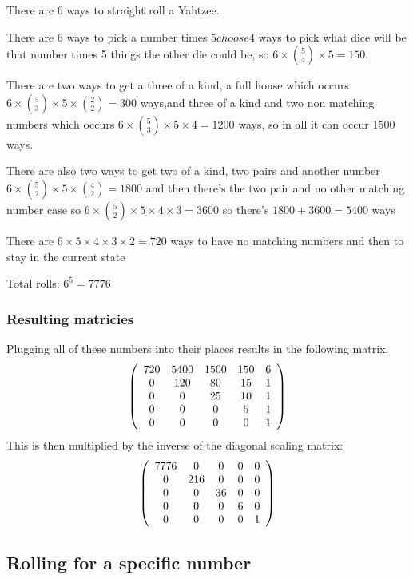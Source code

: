 There are 6 ways to straight roll a Yahtzee.

There are 6 ways to pick a number times ${5 choose 4}$ ways to pick what dice will be that number times 5 things the other die could be, so $6\times{5 \choose 4} \times5 = 150$.

There are two ways to get a three of a kind, a full house which occurs $6\times{5 \choose 3}\times5\times{2 \choose 2}=300$ ways,and three of a kind and two non matching numbers which occurs $6\times{5 \choose 3} \times5\times4=1200$ ways, so in all it can occur 1500 ways.

There are also two ways to get two of a kind, two pairs and another number $6\times{5 \choose 2}\times5\times{4 \choose 2}=1800$ and then there's the two pair and no other matching number case so $6\times{5 \choose 2}\times5\times4\times3=3600$ so there's $1800+3600=5400$ ways

There are $6\times5\times4\times3\times2=720$ ways to have no matching numbers and then to stay in the current state

Total rolls: $6^5=7776$

\subsubsection{Resulting matricies}
Plugging all of these numbers into their places results in the following matrix.
\[
\left(
\begin{array}{c c c c c}
720 & 5400 & 1500 & 150 & 6 \\
0 & 120 & 80 & 15 & 1 \\
0 & 0 & 25 & 10 & 1 \\
0 & 0 & 0 & 5 & 1 \\
0 & 0 & 0 & 0 & 1
\end{array}
\right)
\]
This is then multiplied by the inverse of the diagonal scaling matrix:
\[
\left(
\begin{array}{c c c c c c}
7776& 0 	&0	&0	&0\\
0 	& 216	&0	&0	&0\\
0 	&0		&36	&0	&0\\
0 	&0		&0	&6	&0\\
0 	&0		&0	&0	&1
\end{array}
\right)
\]

\subsection{Rolling for a specific number}


